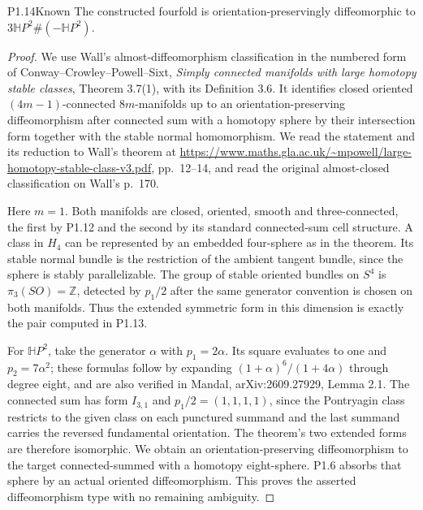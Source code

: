 \begin{statement}{P1.14}{Known}
The constructed fourfold is orientation-preservingly diffeomorphic to
$3\mathbb HP^2\#(-\mathbb HP^2)$.
\end{statement}
\begin{proof}
We use Wall's almost-diffeomorphism classification in the numbered
form of Conway--Crowley--Powell--Sixt,
\emph{Simply connected manifolds with large homotopy stable classes},
Theorem 3.7(1), with its Definition 3.6.  It identifies closed oriented
$(4m-1)$-connected $8m$-manifolds up to an orientation-preserving
diffeomorphism after connected sum with a homotopy sphere by their
intersection form together with the stable normal homomorphism.
We read the statement and its reduction to Wall's theorem at
\url{https://www.maths.gla.ac.uk/~mpowell/large-homotopy-stable-class-v3.pdf},
pp.~12--14, and read the original almost-closed classification on
Wall's p.~170.

Here $m=1$.  Both manifolds are closed, oriented, smooth and
three-connected, the first by P1.12 and the second by its standard
connected-sum cell structure.  A class in $H_4$ can be represented by
an embedded four-sphere as in the theorem.  Its stable normal bundle
is the restriction of the ambient tangent bundle, since the sphere
is stably parallelizable.  The group of stable oriented bundles on
$S^4$ is $\pi_3(SO)=\mathbb Z$, detected by $p_1/2$ after the same
generator convention is chosen on both manifolds.  Thus the extended
symmetric form in this dimension is exactly the pair computed in
P1.13.

For $\mathbb HP^2$, take the generator $\alpha$ with
$p_1=2\alpha$.  Its square evaluates to one and $p_2=7\alpha^2$;
these formulas follow by expanding
$(1+\alpha)^6/(1+4\alpha)$ through degree eight, and are also verified
in Mandal, arXiv:2609.27929, Lemma 2.1.
The connected sum has form $I_{3,1}$ and
$p_1/2=(1,1,1,1)$, since the Pontryagin class restricts to the given
class on each punctured summand and the last summand carries the
reversed fundamental orientation.  The theorem's two extended forms
are therefore isomorphic.  We obtain an orientation-preserving
diffeomorphism to the target connected-summed with a homotopy
eight-sphere.  P1.6 absorbs that sphere by an actual oriented
diffeomorphism.  This proves the asserted diffeomorphism type with
no remaining ambiguity.
\end{proof}

